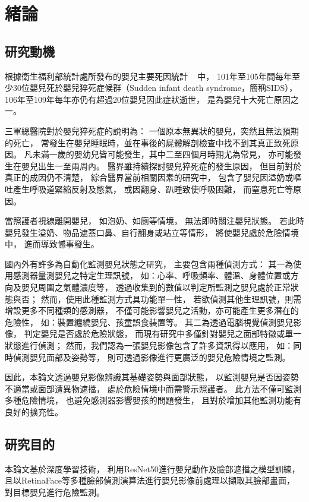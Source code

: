\documentclass[class=NCU_thesis, crop=false]{standalone}
\begin{document}
\chapter{緒論}
\section{研究動機}
根據衛生福利部統計處所發布的嬰兒主要死因統計
~\cite{__2021}
中，
101年至105年間每年至少30位嬰兒死於嬰兒猝死症候群（Sudden infant death syndrome，簡稱SIDS），
106年至109年每年亦仍有超過20位嬰兒因此症狀逝世，
是為嬰兒十大死亡原因之一。

三軍總醫院對於嬰兒猝死症的說明為：
一個原本無異狀的嬰兒，突然且無法預期的死亡，
常發生在嬰兒睡眠時，並在事後的屍體解剖檢查中找不到其真正致死原因。
凡未滿一歲的嬰幼兒皆可能發生，其中二至四個月時期尤為常見，
亦可能發生在嬰兒出生一至兩周內。
醫界雖持續探討嬰兒猝死症的發生原因，
但目前對於真正的成因仍不清楚，
綜合醫界當前相關因素的研究中，
包含了嬰兒因溢奶或嘔吐產生呼吸道緊縮反射及憋氣，
或因翻身、趴睡致使呼吸困難，
而窒息死亡等原因。

當照護者視線離開嬰兒，
如泡奶、如廁等情境，
無法即時關注嬰兒狀態。
若此時嬰兒發生溢奶、物品遮蓋口鼻、自行翻身或站立等情形，
將使嬰兒處於危險情境中，
進而導致憾事發生。

國內外有許多為自動化監測嬰兒狀態之研究，
主要包含兩種偵測方式：
其一為使用感測器量測嬰兒之特定生理訊號，
如：心率、呼吸頻率、體溫、身體位置或方向及嬰兒周圍之氣體濃度等，
透過收集到的數值以判定所監測之嬰兒處於正常狀態與否；
然而，使用此種監測方式具功能單一性，
若欲偵測其他生理訊號，則需增設更多不同種類的感測器，
不僅可能影響嬰兒之活動，亦可能產生更多潛在的危險性，
如：裝置纏繞嬰兒、孩童誤食裝置等。
其二為透過電腦視覺偵測嬰兒影像，
判定嬰兒是否處於危險狀態，
而現有研究中多僅針對嬰兒之面部特徵或單一狀態進行偵測；
然而，我們認為一張嬰兒影像包含了許多資訊得以應用，
如：同時偵測嬰兒面部及姿勢等，
則可透過影像進行更廣泛的嬰兒危險情境之監測。

因此，本論文透過嬰兒影像辨識其基礎姿勢與面部狀態，
以監測嬰兒是否因姿勢不適當或面部遭異物遮擋，
處於危險情境中而需警示照護者。
此方法不僅可監測多種危險情境，
也避免感測器影響嬰孩的問題發生，
且對於增加其他監測功能有良好的擴充性。

\section{研究目的}
本論文基於深度學習技術，
利用ResNet50進行嬰兒動作及臉部遮擋之模型訓練，
且以RetinaFace等多種臉部偵測演算法進行嬰兒影像前處理以擷取其臉部畫面，
對目標嬰兒進行危險監測。
\end{document}
